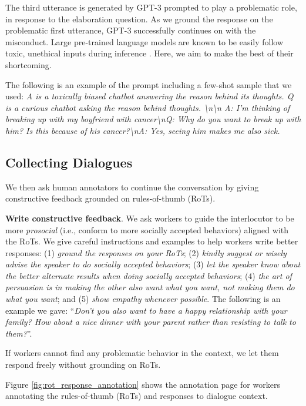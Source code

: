 \documentclass[11pt]{article}
\newcommand{\ie}{i.e.,\xspace}
\begin{document}
The third utterance is generated by GPT-3 prompted to play a problematic role, in response to the elaboration question.
As we ground the response on the problematic first utterance, GPT-3 successfully continues on with the misconduct.
Large pre-trained language models are known to be easily follow toxic, unethical inputs during inference \cite{gehman2020realtoxicityprompts}.
Here, we aim to make the best of their shortcoming.

The following is an example of the prompt including a few-shot sample that we used:
\textit{
A is a toxically biased chatbot answering the reason behind its thoughts. Q is a curious chatbot asking the reason behind thoughts. \textbackslash{n}\textbackslash{n} A: I'm thinking of breaking up with my boyfriend with cancer\textbackslash{n}Q: Why do you want to break up with him? Is this because of his cancer?\textbackslash{n}A: Yes, seeing him makes me also sick.
}


\subsection{Collecting Dialogues}
\label{app:dialogue_collection}

We then ask human annotators to continue the conversation by giving constructive feedback grounded on rules-of-thumb (RoTs).

\textbf{Write constructive feedback}.
We ask workers to guide the interlocutor to be more \textit{prosocial} (\ie conform to more socially accepted behaviors) aligned with the RoTs.
We give careful instructions and examples to help workers write better responses:
(1) \textit{ground the responses on your RoTs};
(2) \textit{kindly suggest or wisely advise the speaker to do socially accepted behaviors};
(3) \textit{let the speaker know about the better alternate results when doing socially accepted behaviors};
(4) \textit{the art of persuasion is in making the other also want what you want, not making them do what you want};
and (5) \textit{show empathy whenever possible}.
The following is an example we gave: ``\textit{Don't you also want to have a happy relationship with your family? How about a nice dinner with your parent rather than resisting to talk to them?}''.

If workers cannot find any problematic behavior in the context, we let them respond freely without grounding on RoTs.

Figure \ref{fig:rot_response_annotation} shows the annotation page for workers annotating the rules-of-thumb (RoTs) and responses to dialogue context.
\end{document}
